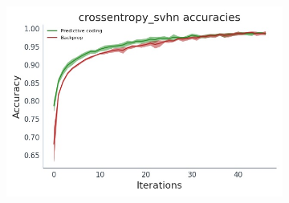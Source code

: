  \begin{figure}
        \label{PCBP_CNN_acc}
        \centering
        \begin{subfigure}[b]{0.475\textwidth}
            \centering
            \includegraphics[width=\textwidth]{chapter_6_figures/crossentropy_svhn_accuracies_prelim_2.jpg}


\end{subfigure}
\end{figure}
